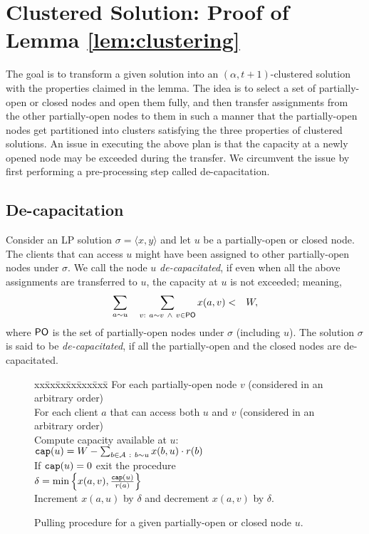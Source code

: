 \documentclass[11pt]{article}
\newcommand{\capa} {{\tt cap}}
\newcommand{\calA} {{\cal A}}
\newcommand{\pair}[2] {\langle #1, #2\rangle}
\newcommand{\PO} {{\sf PO}}
\begin{document}
\section{Clustered Solution: Proof of Lemma \ref{lem:clustering}}
\label{sec:clustering}
The goal is to transform a given solution into an $(\alpha, t+1)$-clustered solution with the properties claimed in the lemma.
The idea is to select a set of partially-open or closed nodes and open them fully, and then transfer assignments
from the other partially-open nodes to them in such a manner that the partially-open nodes get partitioned into clusters
satisfying the three properties of clustered solutions.
An issue in executing the above plan is that 
the capacity at a newly opened node may be exceeded during the transfer.
We circumvent the issue by first performing a pre-processing step called de-capacitation.

\subsection{De-capacitation}
Consider an LP solution $\sigma=\pair{x}{y}$ and let $u$ be a partially-open or closed node. 
The clients that can access $u$ might have been assigned to other partially-open nodes under $\sigma$.
We call the node $u$ {\em de-capacitated}, if even when all the above
assignments are transferred to $u$, the capacity at $u$ is not exceeded; meaning,
\begin{eqnarray*}
	\sum_{a\sim u}\quad \sum_{v:~a\sim v ~ \wedge ~ v\in \PO} x(a,v) &<& W,
\end{eqnarray*}
where $\PO$ is the set of partially-open nodes under $\sigma$ (including $u$).
The solution $\sigma$ is said to be {\em de-capacitated}, if all the partially-open and the closed nodes
are de-capacitated. 

\begin{figure}[t]
\begin{center}
\begin{boxedminipage}{\hsize}
\begin{tabbing}
xx\=xx\=xx\=xx\=xxx\=xxx\=\kill
\> For each partially-open node $v$ (considered in an arbitrary order)\\
\> \> For each client $a$ that can access both $u$ and $v$ (considered in an arbitrary order)\\
\> \> \> Compute capacity available at $u$: $\capa(u) = W - \sum_{b\in \calA~:~b\sim u} x(b, u) \cdot r(b)$\\
\> \> \> If $\capa(u) = 0$ exit the procedure\\
\> \> \> $\delta = \min\left\{x(a, v), \frac{\capa(u)}{r(a)}\right\}$\\
\> \> \> Increment $x(a, u)$ by $\delta$ and decrement $x(a, v)$ by $\delta$.
\end{tabbing}
\end{boxedminipage}
\end{center}
\caption{Pulling procedure for a given partially-open or closed node $u$.}
\label{fig:pulling}
\end{figure}
\end{document}
